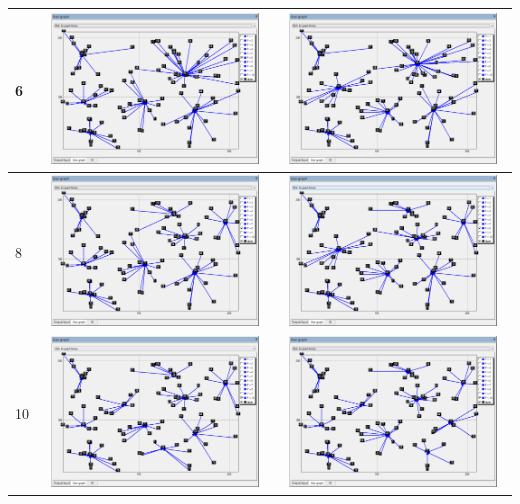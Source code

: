 \documentclass[a4paper,11pt]{article}
\begin{document}
\begin{table}[!htbp]
\begin{tabularx}{\textwidth}{|p{1cm}|X|X|}
6 & \includegraphics[width=6.5cm, height=4cm]{images/greedy_100_p6.png}	& \includegraphics[width=6.5cm, height=4cm]{images/greedy_busqueda_local_100_p6.png}	\\ \hline
8 & \includegraphics[width=6.5cm, height=4cm]{images/greedy_100_p8.png}	& \includegraphics[width=6.5cm, height=4cm]{images/greedy_busqueda_local_100_p8.png}	\\ \hline
10 & \includegraphics[width=6.5cm, height=4cm]{images/greedy_100_p10.png}	& \includegraphics[width=6.5cm, height=4cm]{images/greedy_busqueda_local_100_p10.png}	\\ \hline
\end{tabularx}
\end{table}
\end{document}
